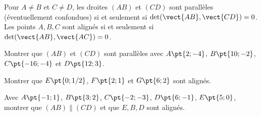 \begin{keypoint}[Applications]
Pour $A\ne B$ et $C\ne D$, les droites $(AB)$ et $(CD)$ sont parallèles (éventuellement confondues) si et seulement si $\det(\vect{AB},\vect{CD})=0$.
Les points $A,B,C$ sont alignés si et seulement si $\det(\vect{AB},\vect{AC})=0$.
\end{keypoint}
\begin{example}Montrer que $(AB)$ et $(CD)$ sont parallèles avec $A\pt{2;-4}$, $B\pt{10;-2}$, $C\pt{-16;-4}$ et $D\pt{12;3}$.\end{example}
\begin{example}Montrer que $E\pt{0;1/2}$, $F\pt{2;1}$ et $G\pt{6;2}$ sont alignés.\end{example}
\begin{example}Avec $A\pt{-1;1}$, $B\pt{3;2}$, $C\pt{-2;-3}$, $D\pt{6;-1}$, $E\pt{5;0}$, montrer que $(AB)\parallel(CD)$ et que $E,B,D$ sont alignés.\end{example}
